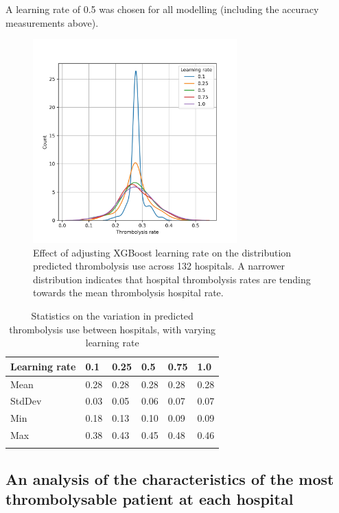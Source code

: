 A learning rate of 0.5 was chosen for all modelling (including the accuracy measurements above).

\begin{figure}
\centering
\includegraphics[width=0.7\textwidth]{./images/91_learning_rate}
\caption{Effect of adjusting XGBoost learning rate on the distribution predicted thrombolysis use across 132 hospitals. A narrower distribution indicates that hospital thrombolysis rates are tending towards the mean thrombolysis hospital rate.}
\label{fig:learning_rate}
\end{figure}

\begin{minipage}{\textwidth}
\begin{longtable}[]{@{}llllll@{}}
\caption{Statistics on the variation in predicted thrombolysis use between hospitals, with varying learning rate}\\
\toprule
Learning rate & 0.1 & 0.25 & 0.5 & 0.75 & 1.0\tabularnewline
\midrule
\endhead
Mean & 0.28 & 0.28 & 0.28 & 0.28 & 0.28\tabularnewline
StdDev & 0.03 & 0.05 & 0.06 & 0.07 & 0.07\tabularnewline
Min & 0.18 & 0.13 & 0.10 & 0.09 & 0.09\tabularnewline
Max & 0.38 & 0.43 & 0.45 & 0.48 & 0.46\tabularnewline
\bottomrule
\label{tab:learning_rate}
\end{longtable}
\end{minipage}

\iffalse

\subsection{An analysis of the characteristics of the most thrombolysable patient at each hospital}

